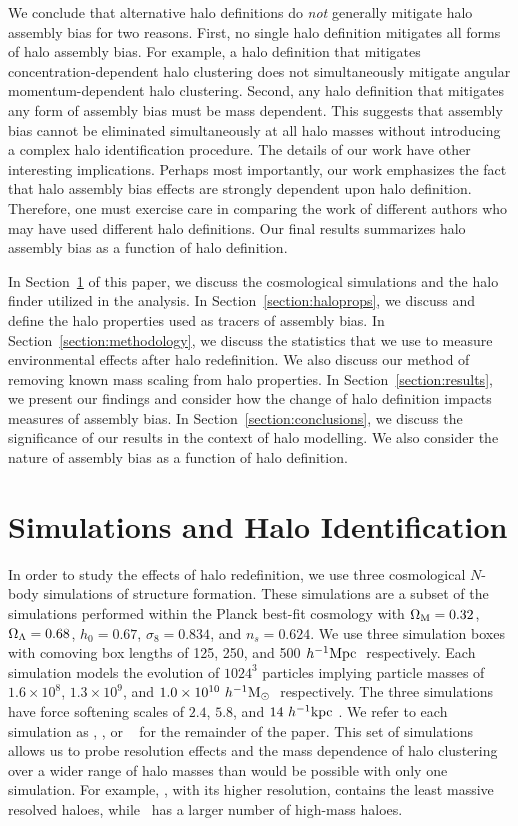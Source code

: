 \documentclass[usenatbib,fleqn]{mnras}
\begin{document}
We conclude that alternative halo definitions do {\em not} generally mitigate halo assembly bias for two reasons. First, no single halo definition mitigates all forms of halo assembly bias. For example, a halo definition that mitigates concentration-dependent halo clustering does not simultaneously mitigate angular momentum-dependent halo clustering. Second, any halo definition that mitigates any form  of assembly bias must be mass dependent. This suggests that assembly bias cannot be eliminated simultaneously at all halo masses without introducing a complex halo identification procedure. The details of our work have other interesting implications. Perhaps most importantly, our work emphasizes the fact that halo assembly bias effects are strongly dependent upon halo definition. Therefore, one must exercise care in comparing the work of different authors who may have used different halo definitions. Our final results summarizes halo assembly bias as a function of halo definition.
 
In Section~\ref{section:data} of this paper, we discuss the cosmological simulations and the halo finder utilized in the analysis. In Section~\ref{section:haloprops}, we discuss and define the halo properties used as tracers of assembly bias. In Section~\ref{section:methodology}, we discuss the statistics that we use to measure environmental effects after halo redefinition. We also discuss our method of removing known mass scaling from halo properties. In Section~\ref{section:results}, we present our findings and consider how the change of halo definition impacts measures of assembly bias. In Section~\ref{section:conclusions}, we discuss the significance of our results in the context of halo modelling. We also consider the nature of assembly bias as a function of halo definition.

\section[]{Simulations and Halo Identification}
\label{section:data}


In order to study the effects of halo redefinition, we use three cosmological $N$-body simulations of structure formation. These simulations are a subset of the  \citet{diemer_kravtsov15} simulations performed within the Planck best-fit cosmology with $\Omega_{\mathrm{M}} = 0.32$, $\Omega_{\Lambda} = 0.68$, $h_0 = 0.67$, $\sigma_8 = 0.834$, and $n_s = 0.624$. We use three simulation boxes with comoving box lengths of 125, 250, and 500$\ h^{-1}\mathrm{Mpc}~$ respectively. Each simulation models the evolution of $1024^3$ particles implying particle masses of $1.6 \times 10^8$, $1.3 \times 10^9$, and $1.0 \times 10^{10}\ h^{-1}\mathrm{M}_{\odot}~$ respectively. The three simulations have force softening scales of $2.4$, $5.8$, and $14 \ h^{-1}\mathrm{kpc}~$. We refer to each simulation as \simA, \simB, or \simC~ for the remainder of the paper. This set of simulations allows us to probe resolution effects and the mass dependence of halo clustering over a wider range of halo masses than would be possible with only one simulation. For example, \simA, with its higher resolution, contains the least massive resolved haloes, while \simC~has a larger number of high-mass haloes.
\end{document}
